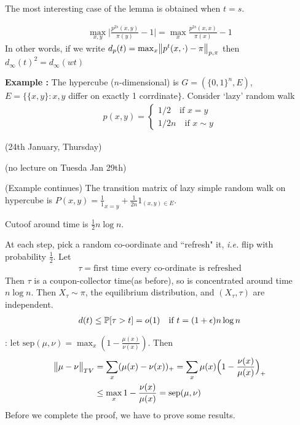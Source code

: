 \documentclass[12pt,a4paper]{article}
\newenvironment{proof}
{\begin{changemargin}{1cm}{0.5cm} 
	}%
	{\end{changemargin}
}
\newenvironment{subproof}
{\begin{changemargin}{0.5cm}{0.5cm} 
	}%
	{\end{changemargin}
}
\begin{document}
The most interesting case of the lemma is obtained when $t=s$.
\s

\corr \begin{align*}
\max_{x,y} \Big| \frac{p^{2s}(x,y)}{\pi(y)} -1 \Big| = \max_x  \frac{p^{2s} (x,x)}{\pi(x)} - 1
\end{align*}
In other words, if we write $d_p(t) = \max_x \bigl\lVert p^t(x,\cdot) -\pi\bigr\rVert_{p, \pi}$ then $d_{\infty}(t)^2 = d_{\infty}(wt)$
\s

\textbf{Example :} The hypercube ($n$-dimensional) is $G= (\{0,1\}^n, E)$, $E= \{ \{x,y\} : x,y$ differ on exactly 1 corrdinate$\}$. Consider `lazy' random walk
\begin{align*}
p(x,y) =\begin{cases}
1/2 \quad \text{if }x=y \\
1/2n \quad \text{if } x\sim y
\end{cases}
\end{align*}

\newday

(24th January, Thursday)
\s

(no lecture on Tuesda Jan 29th)
\s

(Example continues) The transition matrix of lazy simple random walk on hypercube is $P(x,y) = \frac{1}1_{x=y} + \frac{1}{2n}1_{(x,y)\in E}$.
\s

\thm Cutoof around time is $\frac{1}{2}n\log n$.
\begin{proof}
\pf At each step, pick a random co-oordinate and ``refresh" it, \textit{i.e.} flip with probability $\frac{1}{2}$. Let
\begin{align*}
\tau = \text{first time every co-ordinate is refreshed}
\end{align*}
Then $\tau$ is a coupon-collector time(as before), so is concentrated around time $n\log n$. Then $X_{\tau} \sim \pi$, the equilibrium distribution, and $(X_{\tau}, \tau)$ are independent.
\begin{align*}
d(t) \leq \mathbb{P} [\tau >t] = o(1) \quad \text{if } t= (1+ \epsilon) n\log n
\end{align*}
\begin{subproof}
: let $\text{sep}(\mu, \nu) = \max_x (1- \frac{\mu(x)}{\nu(x)})$. Then
\begin{align*}
\bigl\lVert\mu -\nu\bigr\rVert_{TV} &= \sum_{x}(\mu(x)- \nu(x))_+ = \sum_{x} \mu(x) \Big( 1- \frac{\nu(x)}{\mu(x)} \Big)_+ \\
&\leq \max_x 1- \frac{\nu(x)}{\mu(x)} = \text{sep}(\mu, \nu)
\end{align*}
Before we complete the proof, we have to prove some results.
\end{subproof}
\end{proof}
\end{document}
